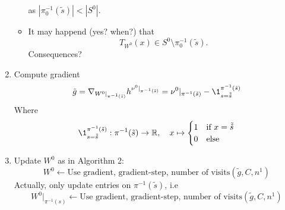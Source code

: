 \documentclass[
     12pt,         %
     a4paper,      %
     BCOR=10mm,     %
     DIV=14,        %
     ]{scrreprt}
\begin{document}
\begin{enumerate}
\begin{itemize}
                as $|\pi_0^{-1}(\tilde s)| < |S^0|$.
            \item It may happend (yes? when?) that
                \[T_{W^0}(x) \in S^0 \setminus \pi_0^{-1}(\tilde s). \]
                Consequences?
        \end{itemize}
    \item Compute gradient 
        \[\tilde g = \nabla_{W^0|_{\pi^{-1}(\tilde s)}} h^{\nu^0|_{\pi^{-1}(\tilde s)}} = \nu^0|_{\pi^{-1}(\tilde s)} - \1_{s=\tilde{\tilde{s}}}^{\pi^{-1}(\tilde s)} \]
        Where \[\1_{s=\tilde{\tilde{s}}}^{\pi^{-1}(\tilde s)}: \pi^{-1}(\tilde s) \to \R, \quad     
            x \mapsto
            \begin{cases} 
                1 &\mbox{if } x=\tilde{\tilde{s}} \\
                0 & \mbox{else } 
            \end{cases}  \]
    \item Update $W^0$ as in Algorithm 2: 
        \[W^0 \longleftarrow \text{Use gradient, gradient-step, number of visits} (\tilde g, C, n^1)  \]
        Actually, only update entries on $\pi^{-1}(\tilde s)$, i.e 
        \[ W^0|_{\pi^{-1}(s)} \longleftarrow \text{Use gradient, gradient-step, number of visits} (\tilde g, C, n^1)  \]
\end{enumerate}
\end{document}
